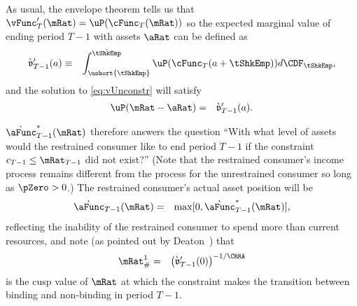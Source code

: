 \documentclass[titlepage]{\econtex}\providecommand{\texname}{BufferStockTheory}%
\begin{document}
As usual, the envelope theorem tells us that
$\vFunc_{T}^{\prime}(\mRat)=\uP(\cFunc_{T}(\mRat))$ so the expected marginal
value of ending period $T-1$ with assets $\aRat$ can be defined as
\begin{eqnarray}
  \grave{\mathfrak{v}}_{T-1}^{\prime}(a) & \equiv & \int_{\ushort{\tShkEmp}}^{\bar{\tShkEmp}} \uP(\cFunc_{T}(a+\tShkEmp)) d\CDF_{\tShkEmp}, \notag
\end{eqnarray}
and the solution to \eqref{eq:vUnconstr} will satisfy
\begin{eqnarray}
  \uP(\mRat-\aRat) & = &  \grave{\mathfrak{v}}_{T-1}^{\prime}(a) \label{eq:uPConstr}.
%
\end{eqnarray}

$\grave{\aFunc}_{T-1}^{*}(\mRat)$ therefore answers the question ``With what
level of assets would the restrained consumer like to end period $T-1$
if the constraint $c_{T-1} \leq \mRat_{T-1}$ did not exist?''  (Note that
the restrained consumer's income process remains different from the
process for the unrestrained consumer so long as $\pZero>0$.)  The
restrained consumer's actual asset position will be
 \begin{eqnarray}
  \grave{\aFunc}_{T-1}(\mRat) & = & \max[0,\grave{\aFunc}^{*}_{T-1}(\mRat)], \notag
\end{eqnarray}
reflecting the inability of the restrained consumer to spend more than
current resources, and note (as pointed out by
Deaton~\citeyearpar{deatonLiqConstr}) that
 \begin{eqnarray}
  \mRat^{1}_{\#} & = & \left( \grave{\mathfrak{v}}_{T-1}^{\prime}(0)\right)^{-1/\CRRA} \notag
 \end{eqnarray}
is the cusp value of $\mRat$ at which the constraint makes the
transition between binding and non-binding in period $T-1$.
\end{document}
